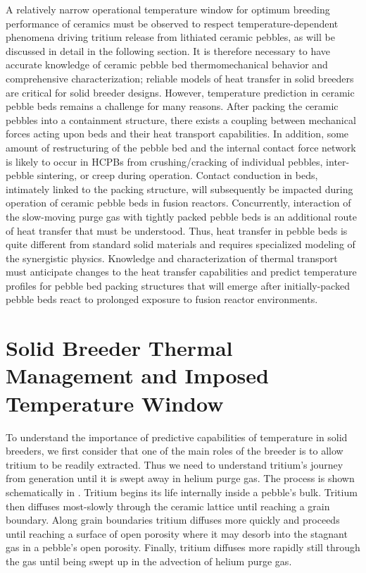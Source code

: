 A relatively narrow operational temperature window for optimum breeding performance of ceramics must be observed to respect temperature-dependent phenomena driving tritium release from lithiated ceramic pebbles, as will be discussed in detail in the following section. It is therefore necessary to have accurate knowledge of ceramic pebble bed thermomechanical behavior and comprehensive characterization; reliable models of heat transfer in solid breeders are critical for solid breeder designs. However, temperature prediction in ceramic pebble beds remains a challenge for many reasons. After packing the ceramic pebbles into a containment structure, there exists a coupling between mechanical forces acting upon beds and their heat transport capabilities. In addition, some amount of restructuring of the pebble bed and the internal contact force network is likely to occur in HCPBs from crushing/cracking of individual pebbles, inter-pebble sintering, or creep during operation. Contact conduction in beds, intimately linked to the packing structure, will subsequently be impacted during operation of ceramic pebble beds in fusion reactors. Concurrently, interaction of the slow-moving purge gas with tightly packed pebble beds is an additional route of heat transfer that must be understood. Thus, heat transfer in pebble beds is quite different from standard solid materials and requires specialized modeling of the synergistic physics. Knowledge and characterization of thermal transport must anticipate changes to the heat transfer capabilities and predict temperature profiles for pebble bed packing structures that will emerge after initially-packed pebble beds react to prolonged exposure to fusion reactor environments.

\section{Solid Breeder Thermal Management and Imposed Temperature Window}

To understand the importance of predictive capabilities of temperature in solid breeders, we first consider that one of the main roles of the breeder is to allow tritium to be readily extracted. Thus we need to understand tritium's journey from generation until it is swept away in helium purge gas. The process is shown schematically in . Tritium begins its life internally inside a pebble's bulk. Tritium then diffuses most-slowly through the ceramic lattice until reaching a grain boundary. Along grain boundaries tritium diffuses more quickly and proceeds until reaching a surface of open porosity where it may desorb into the stagnant gas in a pebble's open porosity. Finally, tritium diffuses more rapidly still through the gas until being swept up in the advection of helium purge gas.\cite{Federici1990} 


